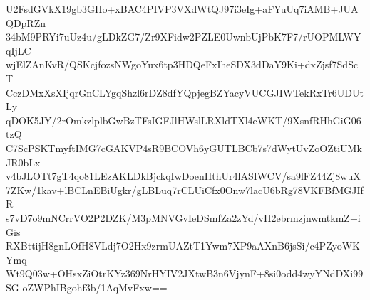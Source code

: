U2FsdGVkX19gb3GHo+xBAC4PIVP3VXdWtQJ97i3eIg+aFYuUq7iAMB+JUAQDpRZn
34bM9PRYi7uUz4u/gLDkZG7/Zr9XFidw2PZLE0UwnbUjPbK7F7/rUOPMLWYqIjLC
wjElZAnKvR/QSKcjfozsNWgoYux6tp3HDQeFxIheSDX3dDaY9Ki+dxZjsf7SdScT
CczDMxXsXIjqrGnCLYgqShzl6rDZ8dfYQpjegBZYacyVUCGJIWTekRxTr6UDUtLy
qDOK5JY/2rOmkzlplbGwBzTFsIGFJlHWslLRXldTXl4eWKT/9XsnfRHhGiG06tzQ
C7ScPSKTmyftIMG7cGAKVP4sR9BCOVh6yGUTLBCb7s7dWytUvZoOZtiUMkJR0bLx
v4bJLOTt7gT4qo81LEzAKLDkBjckqIwDoenIIthUr4lASIWCV/sa9lFZ44Zj8wuX
7ZKw/1kav+lBCLnEBiUgkr/gLBLuq7rCLUiCfx0Onw7lacU6bRg78VKFBfMGJIfR
s7vD7o9mNCrrVO2P2DZK/M3pMNVGvIeDSmfZa2zYd/vII2ebrmzjnwmtkmZ+iGis
RXBttijH8gnLOfH8VLdj7O2Hx9zrmUAZtT1Ywm7XP9aAXnB6jsSi/c4PZyoWKYmq
Wt9Q03w+OHsxZiOtrKYz369NrHYIV2JXtwB3n6VjynF+8si0odd4wyYNdDXi99SG
oZWPhIBgohf3b/1AqMvFxw==
